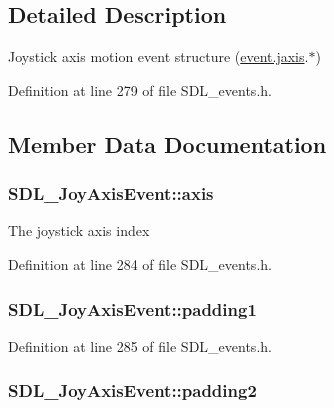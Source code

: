 \subsection{Detailed Description}
Joystick axis motion event structure (\hyperlink{union_s_d_l___event_ac4611acd0e9c675e67dc20919f0accb4}{event.\-jaxis}.$\ast$) 

Definition at line 279 of file S\-D\-L\-\_\-events.\-h.



\subsection{Member Data Documentation}
\hypertarget{struct_s_d_l___joy_axis_event_a0beac2fb161e45771c424bd0b6daeabb}{
\subsubsection[{axis}]{ S\-D\-L\-\_\-\-Joy\-Axis\-Event\-::axis}}\label{struct_s_d_l___joy_axis_event_a0beac2fb161e45771c424bd0b6daeabb}
The joystick axis index 

Definition at line 284 of file S\-D\-L\-\_\-events.\-h.

\hypertarget{struct_s_d_l___joy_axis_event_ae8e17bced478530638982f0382a0dafa}{
\subsubsection[{padding1}]{ S\-D\-L\-\_\-\-Joy\-Axis\-Event\-::padding1}}\label{struct_s_d_l___joy_axis_event_ae8e17bced478530638982f0382a0dafa}


Definition at line 285 of file S\-D\-L\-\_\-events.\-h.

\hypertarget{struct_s_d_l___joy_axis_event_ad5407250032f618fde7437ac5f229257}{
\subsubsection[{padding2}]{ S\-D\-L\-\_\-\-Joy\-Axis\-Event\-::padding2}}\label{struct_s_d_l___joy_axis_event_ad5407250032f618fde7437ac5f229257}


